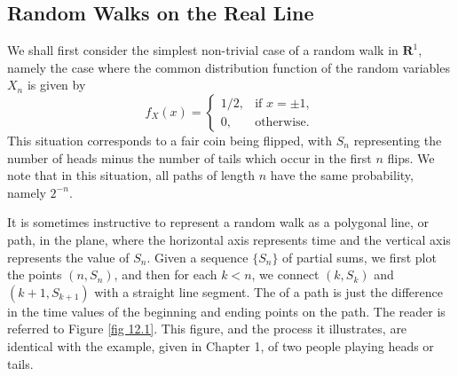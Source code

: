 \subsection*{Random Walks on the Real Line}
We shall first consider the simplest non-trivial case
of a random walk in ${\mathbf R}^1$, namely the case where the common distribution function of
the random variables $X_n$ is  given by
$$
f_X(x) = \left \{ \begin{array}{ll}
                        1/2, & \mbox{if $x = \pm 1,$} \\
                          0, & \mbox{otherwise.} 
                  \end{array}
         \right.  
$$
This situation corresponds to a fair coin being flipped, with $S_n$ representing the number of
heads minus the number of tails which occur in the first $n$ flips.  We note that in this
situation, all paths of length $n$ have the same probability, namely $2^{-n}$.
\par
It is sometimes instructive to represent a random walk as a polygonal line, or path, in
the plane, where the horizontal axis represents time and the vertical axis represents the value
of $S_n$.  Given a sequence $\{S_n\}$ of partial sums, we first plot the points $(n, S_n)$, and
then for each $k < n$, we connect $(k, S_k)$ and $(k+1, S_{k+1})$ with a straight line segment.
The  of a path is just the difference in the time values of the beginning
and  ending points on the path.  The reader is referred to Figure \ref{fig 12.1}.  This
figure, and the process it illustrates, are identical with the example, given in Chapter
1, of two people playing heads or tails.
